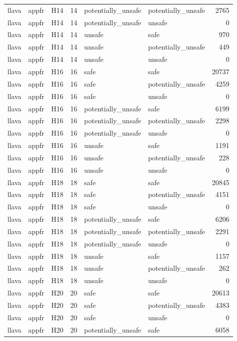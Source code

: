 \begin{table}[tbp]
\begin{tabular}{lllrllr}
llava & appfr & H14 & 14 & potentially\_unsafe & potentially\_unsafe & 2765 \\
llava & appfr & H14 & 14 & potentially\_unsafe & unsafe & 0 \\
llava & appfr & H14 & 14 & unsafe & safe & 970 \\
llava & appfr & H14 & 14 & unsafe & potentially\_unsafe & 449 \\
llava & appfr & H14 & 14 & unsafe & unsafe & 0 \\
llava & appfr & H16 & 16 & safe & safe & 20737 \\
llava & appfr & H16 & 16 & safe & potentially\_unsafe & 4259 \\
llava & appfr & H16 & 16 & safe & unsafe & 0 \\
llava & appfr & H16 & 16 & potentially\_unsafe & safe & 6199 \\
llava & appfr & H16 & 16 & potentially\_unsafe & potentially\_unsafe & 2298 \\
llava & appfr & H16 & 16 & potentially\_unsafe & unsafe & 0 \\
llava & appfr & H16 & 16 & unsafe & safe & 1191 \\
llava & appfr & H16 & 16 & unsafe & potentially\_unsafe & 228 \\
llava & appfr & H16 & 16 & unsafe & unsafe & 0 \\
llava & appfr & H18 & 18 & safe & safe & 20845 \\
llava & appfr & H18 & 18 & safe & potentially\_unsafe & 4151 \\
llava & appfr & H18 & 18 & safe & unsafe & 0 \\
llava & appfr & H18 & 18 & potentially\_unsafe & safe & 6206 \\
llava & appfr & H18 & 18 & potentially\_unsafe & potentially\_unsafe & 2291 \\
llava & appfr & H18 & 18 & potentially\_unsafe & unsafe & 0 \\
llava & appfr & H18 & 18 & unsafe & safe & 1157 \\
llava & appfr & H18 & 18 & unsafe & potentially\_unsafe & 262 \\
llava & appfr & H18 & 18 & unsafe & unsafe & 0 \\
llava & appfr & H20 & 20 & safe & safe & 20613 \\
llava & appfr & H20 & 20 & safe & potentially\_unsafe & 4383 \\
llava & appfr & H20 & 20 & safe & unsafe & 0 \\
llava & appfr & H20 & 20 & potentially\_unsafe & safe & 6058 \\

\end{tabular}
\end{table}
